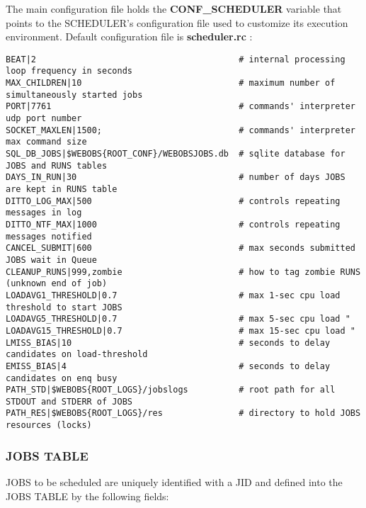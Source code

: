 The main configuration file  holds the \textbf{CONF\_SCHEDULER} variable that points to the SCHEDULER's configuration file used to 
customize its execution environment. Default configuration file is \textbf{scheduler.rc} :

\begin{lstlisting}[title=\wofile{scheduler.rc}]
BEAT|2                                        # internal processing loop frequency in seconds
MAX_CHILDREN|10                               # maximum number of simultaneously started jobs
PORT|7761                                     # commands' interpreter udp port number
SOCKET_MAXLEN|1500;                           # commands' interpreter max command size 
SQL_DB_JOBS|$WEBOBS{ROOT_CONF}/WEBOBSJOBS.db  # sqlite database for JOBS and RUNS tables
DAYS_IN_RUN|30                                # number of days JOBS are kept in RUNS table
DITTO_LOG_MAX|500                             # controls repeating messages in log
DITTO_NTF_MAX|1000                            # controls repeating messages notified
CANCEL_SUBMIT|600                             # max seconds submitted JOBS wait in Queue
CLEANUP_RUNS|999,zombie                       # how to tag zombie RUNS (unknown end of job)
LOADAVG1_THRESHOLD|0.7                        # max 1-sec cpu load threshold to start JOBS 
LOADAVG5_THRESHOLD|0.7                        # max 5-sec cpu load "
LOADAVG15_THRESHOLD|0.7                       # max 15-sec cpu load "
LMISS_BIAS|10                                 # seconds to delay candidates on load-threshold
EMISS_BIAS|4                                  # seconds to delay candidates on enq busy 
PATH_STD|$WEBOBS{ROOT_LOGS}/jobslogs          # root path for all STDOUT and STDERR of JOBS
PATH_RES|$WEBOBS{ROOT_LOGS}/res               # directory to hold JOBS resources (locks)
\end{lstlisting}


\subsubsection{JOBS TABLE}

JOBS to be scheduled are uniquely identified with a JID and defined into the JOBS TABLE by the following fields:

